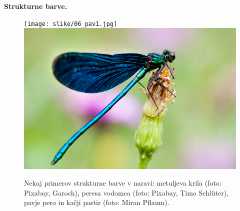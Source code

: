\begin{example}{\bf Strukturne barve.}
\begin{figure}[!h]
\texttt{[image: slike/06\_pav1.jpg]}\hfill
\includegraphics[width=7truecm]{slike/06_pastir.jpg}
\caption{Nekaj primerov strukturne barve v naravi: metuljeva krila (foto: Pixabay, Garoch), peresa vodomca (foto:
Pixabay, Timo Schl\"uter), pavje pero in kačji pastir (foto: Miran Pflaum).}
\label{fig:06_FK}
\end{figure}
 
\end{example}







